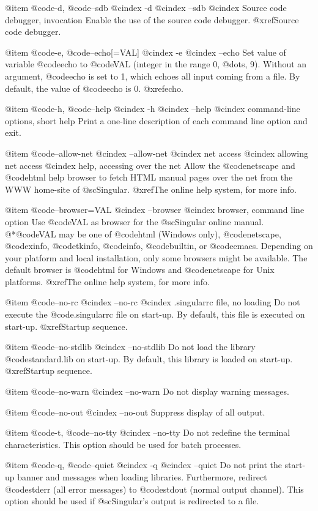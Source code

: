 @item @code{-d}, @code{--sdb}
@cindex -d
@cindex --sdb
@cindex Source code debugger, invocation
Enable the use of the source code debugger.
@xref{Source code debugger}.

@item @code{-e}, @code{--echo[=VAL]}
@cindex -e
@cindex --echo
Set value of variable @code{echo} to @code{VAL} (integer in the range
0, @dots{}, 9). Without an argument, @code{echo} is set to 1, which echoes
all input coming from a file. By default, the value of @code{echo} is
0. @xref{echo}.

@item @code{-h}, @code{--help}
@cindex -h
@cindex --help
@cindex command-line options, short help
Print a one-line description of each command line option and exit.

@item @code{--allow-net}
@cindex --allow-net
@cindex net access
@cindex allowing net access
@cindex help, accessing over the net
Allow the @code{netscape} and @code{html} help browser to fetch HTML manual pages over
the net from the WWW home-site of @sc{Singular}. @xref{The online help
system}, for more info.

@item @code{--browser=VAL}
@cindex --browser
@cindex browser, command line option
Use @code{VAL} as browser for the @sc{Singular} online manual.
@*@code{VAL} may be one of @code{html} (Windows only), @code{netscape}, @code{xinfo},
@code{tkinfo}, @code{info}, @code{builtin}, or @code{emacs}. Depending
on your platform and local
installation, only some browsers might be available. The default browser
is @code{html} for Windows and @code{netscape} for Unix
platforms. @xref{The online help system}, for more info.

@item @code{--no-rc}
@cindex --no-rc
@cindex .singularrc file, no loading
Do not execute the @code{.singularrc} file on start-up.  By default,
this file is executed on start-up.  @xref{Startup sequence}.

@item @code{--no-stdlib}
@cindex --no-stdlib
Do not load the library @code{standard.lib} on start-up. By default,
this library is loaded on start-up.  @xref{Startup sequence}.

@item @code{--no-warn}
@cindex --no-warn
Do not display warning messages.

@item @code{--no-out}
@cindex --no-out
Suppress display of all output.

@item @code{-t}, @code{--no-tty}
@cindex --no-tty
Do not redefine the terminal characteristics.  This option should be
used for batch processes.

@item @code{-q}, @code{--quiet}
@cindex -q
@cindex --quiet
Do not print the start-up banner and messages when loading
libraries. Furthermore, redirect @code{stderr}
(all error messages) to @code{stdout} (normal output channel).  This
option should be used if @sc{Singular}'s output is redirected to a file.

